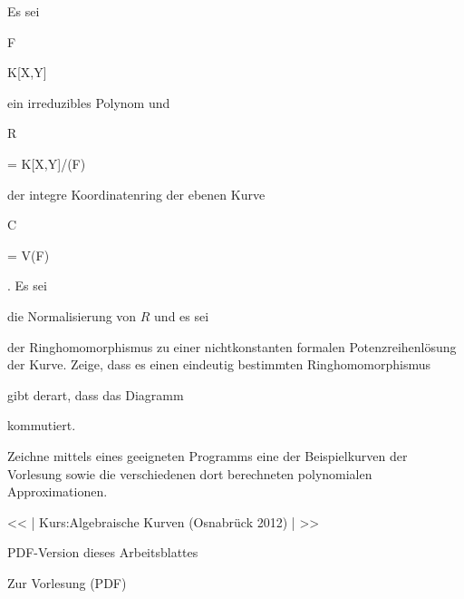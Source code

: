 {


Es sei


\mavergleichskette

{\vergleichskette

{ F
}

{ \in }{ K[X,Y]
}

{  }{
}

{    }{
}

{   }{
}

}
{}{}{}
ein irreduzibles Polynom und


\mavergleichskette

{\vergleichskette

{ R
}

{ = }{ K[X,Y]/(F)
}

{  }{
}

{    }{
}

{   }{
}

}
{}{}{}
der integre Koordinatenring der ebenen Kurve


\mavergleichskette

{\vergleichskette

{ C
}

{ = }{ V(F)
}

{  }{
}

{    }{
}

{   }{
}

}
{}{}{.}
Es sei

 die Normalisierung von $R$ und es sei

 der Ringhomomorphismus zu einer nichtkonstanten formalen Potenzreihenlösung der Kurve. Zeige, dass es einen eindeutig bestimmten Ringhomomorphismus

 gibt derart, dass das Diagramm


 {  }


kommutiert.


}

{} {}





{}

{


Zeichne mittels eines geeigneten Programms eine der Beispielkurven der Vorlesung sowie die verschiedenen dort berechneten polynomialen Approximationen.


}

{} {}


<< | Kurs:Algebraische Kurven (Osnabrück 2012) | >>


PDF-Version dieses Arbeitsblattes


 Zur Vorlesung
(PDF)
